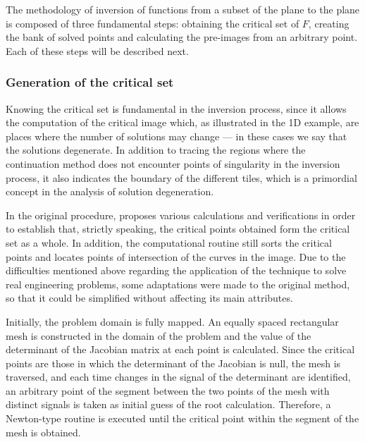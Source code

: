\documentclass[journal=iecred,manuscript=article]{achemso}
\theoremstyle{definition}
\theoremstyle{remark}
\begin{document}

The methodology of inversion of functions from
a subset of the plane to the plane is composed of three 
fundamental steps: obtaining the critical set of $ F $, 
creating the bank of solved points and calculating the pre-images from an arbitrary point. Each of these steps will be described next.

\subsubsection{Generation of the critical set}

Knowing the critical set is fundamental in the inversion process, since it 
allows the computation of the critical image which, as
illustrated in the 1D example, are places where the number
of solutions may change --- in these cases we say that the 
solutions
degenerate.
 In addition to tracing the regions where the continuation method does not encounter points of singularity in the inversion process, it also indicates the boundary
 of the  different tiles, which is a primordial concept in the analysis of solution degeneration. 

In the original procedure, \citet{malta} proposes various calculations and verifications in order to establish that, strictly speaking, the critical points obtained form the critical set as a whole. In addition, the computational routine still sorts the critical points and locates points of intersection of the curves in the image. Due to the difficulties mentioned above regarding the application of the technique to solve real engineering problems, some adaptations were made to the original method, so that it could be simplified without affecting its main attributes.

Initially, the problem domain is fully mapped. An equally spaced rectangular mesh is constructed in the domain of the problem and the value of the determinant of the Jacobian matrix at each point is calculated. Since the critical points are those in which the determinant of the Jacobian is null, the mesh is traversed, and each time changes 
  in the signal of the determinant are identified,
   an arbitrary point of the segment between the two points 
   of the mesh with distinct signals is taken as initial guess of the root calculation.
    Therefore, a Newton-type routine is executed until the critical point within the segment of the mesh
     is obtained.
\end{document}

